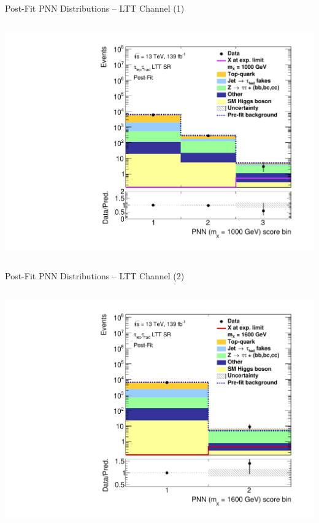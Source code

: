 \documentclass[11pt, xcolor={dvipsnames}, aspectratio=169]{beamer}
\begin{document}
\begin{frame}{Post-Fit PNN Distributions -- \allbold{\lephad} LTT Channel (1)}
\begin{columns}
    \centering


    \includegraphics[width=\textwidth]{results_res/postfit/Region_BMin0_incJet1_dist1000_J2_D2HDMPNN_T2_SpcTauLH_Y2015_LTT1_L1_GlobalFit_conditionnal_mu0log}

  \end{columns}
\end{frame}


\begin{frame}{Post-Fit PNN Distributions -- \allbold{\lephad} LTT Channel (2)}
  \begin{columns}
    \centering


    \includegraphics[width=\textwidth]{results_res/postfit/Region_BMin0_incJet1_dist1600_J2_D2HDMPNN_T2_SpcTauLH_Y2015_LTT1_L1_GlobalFit_conditionnal_mu0log}

  \end{columns}
\end{frame}
\end{document}
